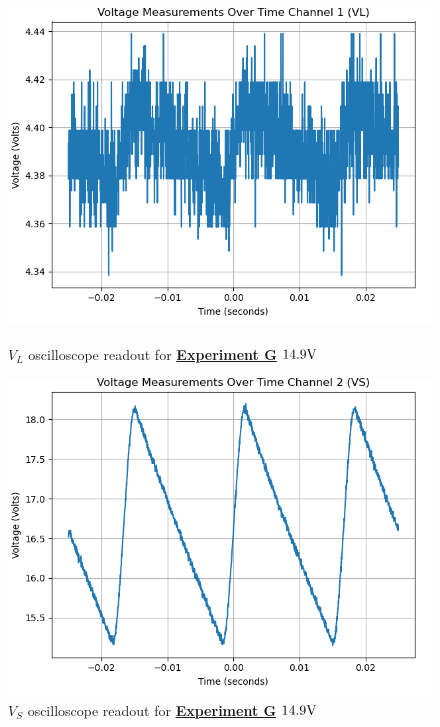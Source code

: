 \documentclass[
	letterpaper
	12pt
]{template}
\newcommand{\bref}[2]{\textbf{\hyperref[#1]{#2}}}
\begin{document}
\begin{figure}[H]\label{data::G3}
	\centering
	\begin{minipage}[c]{0.45\textwidth}
		\centering
		\includegraphics[width=\textwidth]{figures/G/3--ch1.png}
	    \caption{$V_{L}$ oscilloscope readout for \bref{exp::G}{Experiment G} $14.9\unit V$ }
	\end{minipage}
	\hfill
	\begin{minipage}[c]{0.45\textwidth}
		\centering
		\includegraphics[width=\textwidth]{figures/G/3--ch2.png}
	    \caption{$V_{S}$ oscilloscope readout for \bref{exp::G}{Experiment G} $14.9\unit V$ }
	\end{minipage}
\end{figure}
\end{document}
